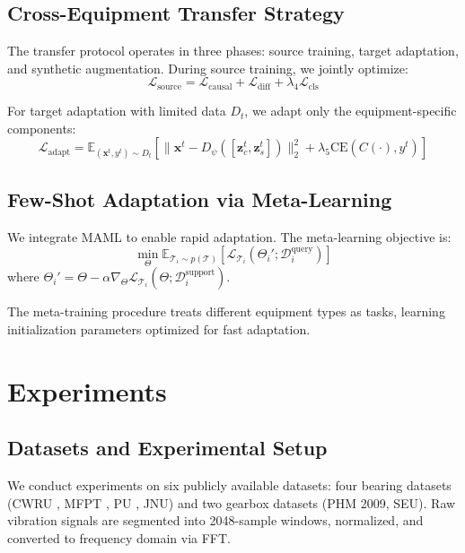 \documentclass[lettersize,journal]{IEEEtran}
\begin{document}
\subsection{Cross-Equipment Transfer Strategy}

The transfer protocol operates in three phases: source training, target adaptation, and synthetic augmentation. During source training, we jointly optimize:
\begin{equation}
\mathcal{L}_{\text{source}} = \mathcal{L}_{\text{causal}} + \mathcal{L}_{\text{diff}} + \lambda_4\mathcal{L}_{\text{cls}}
\end{equation}

For target adaptation with limited data $D_t$, we adapt only the equipment-specific components:
\begin{equation}
\mathcal{L}_{\text{adapt}} = \mathbb{E}_{(\mathbf{x}^t,y^t)\sim D_t}\left[\|\mathbf{x}^t - D_\psi([\mathbf{z}_c^t, \mathbf{z}_s^t])\|_2^2 + \lambda_5\text{CE}(C(\cdot), y^t)\right]
\end{equation}

\subsection{Few-Shot Adaptation via Meta-Learning}

We integrate MAML \cite{ref13} to enable rapid adaptation. The meta-learning objective is:
\begin{equation}
\min_{\Theta} \mathbb{E}_{\mathcal{T}_i \sim p(\mathcal{T})}\left[\mathcal{L}_{\mathcal{T}_i}(\Theta_i'; \mathcal{D}_i^{\text{query}})\right]
\end{equation}
where $\Theta_i' = \Theta - \alpha \nabla_\Theta \mathcal{L}_{\mathcal{T}_i}(\Theta; \mathcal{D}_i^{\text{support}})$.

The meta-training procedure treats different equipment types as tasks, learning initialization parameters optimized for fast adaptation.

\section{Experiments}

\subsection{Datasets and Experimental Setup}

We conduct experiments on six publicly available datasets: four bearing datasets (CWRU \cite{cwru_dataset}, MFPT \cite{mfpt_dataset}, PU \cite{pu_dataset}, JNU) and two gearbox datasets (PHM 2009, SEU). Raw vibration signals are segmented into 2048-sample windows, normalized, and converted to frequency domain via FFT.
\end{document}
